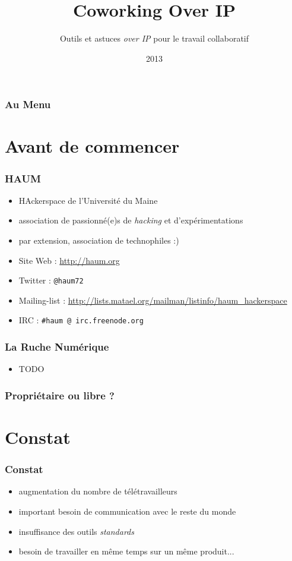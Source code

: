 \documentclass{beamer}
\title[Coworking-oIP]{Coworking Over IP}
\author{Outils et astuces \textit{over IP} pour le travail collaboratif}
\institute{Mathieu (matael) Gaborit | HAUM | Ruche Numérique}
\date{2013}
\begin{document}
\begin{frame}
\titlepage
\end{frame}

\begin{frame}
\frametitle{Au Menu}
\tableofcontents
\end{frame}

\section{Avant de commencer} %

\begin{frame}
    \frametitle{HAUM}

    \begin{itemize}
        \item HAckerspace de l'Université du Maine
        \item association de passionné(e)s de \textit{hacking} et d'expérimentations
        \item par extension, association de technophiles :)
        \item Site Web : \url{http://haum.org}
        \item Twitter : \texttt{@haum72}
        \item Mailing-list : \url{http://lists.matael.org/mailman/listinfo/haum_hackerspace}
        \item IRC : \texttt{\#haum @ irc.freenode.org}
    \end{itemize}
\end{frame}

\begin{frame}
    \frametitle{La Ruche Numérique}

    \begin{itemize}
        \item TODO
    \end{itemize}
\end{frame}

\begin{frame}
    \frametitle{Propriétaire ou libre ?} 

\end{frame}

\section{Constat}

\begin{frame}
    \frametitle{Constat}

    \begin{itemize}[<+->]
        \item augmentation du nombre de télétravailleurs
        \item important besoin de communication avec le reste du monde
        \item insuffisance des outils \textit{standards}
        \item besoin de travailler en même temps sur un même produit...
    \end{itemize}
\end{frame}
\end{document}
